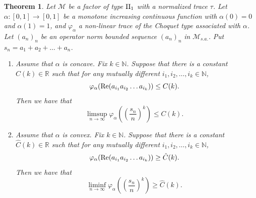 \documentclass[a4paper,12pt]{amsart}
\newtheorem{theorem}[definition]{Theorem}
\newcommand{\M}{\mathcal{M}}
\newcommand{\N}{\mathbb{N}}
\begin{document}
\begin{theorem} \label{psudo law of large numbers}
Let $\M$ be a factor of type ${\rm II}_1$ with a normalized trace $\tau$.  
Let $\alpha: [0,1]  \rightarrow [0, 1]$ be a monotone increasing continuous function with $\alpha(0) = 0$ 
and $\alpha(1) = 1$, and
$\varphi_{\alpha}$ a non-linear trace of the Choquet type associated with $\alpha$.  
Let $(a_n)_n$ be an operator norm bounded sequence $(a_n)_n$ in ${\M}_{s.a.}$. 
Put $s_n = a_1 + a_2 + \dots +a_n$.  
\begin{enumerate}
\item[(1)] Assume that  $\alpha$ is concave. Fix $k \in  \N$. Suppose that there is a constant 
$C(k) \in {\mathbb R}$ such that  
for any mutually different $i_1, i_2, \dots, i_k \in \N$, 
$$
\varphi_{\alpha}({\rm Re} (a_{i_1}a_{i_2} \dots a_{i_k}) ) \leq C(k).  
$$
Then we have that 
\[  \limsup _{n \to \infty}  \varphi_{\alpha}((\frac{s_n}{n})^k) \leq C(k) .\]
\item[(2)] Assume that  $\alpha$ is convex. Fix $k \in  \N$. Suppose that there is a constant 
$\hat{C}(k) \in {\mathbb R}$ such that  
for any mutually different $i_1, i_2, \dots, i_k \in \N$,   
$$
\varphi_{\alpha}({\rm Re} (a_{i_1}a_{i_2} \dots a_{i_k}) ) \geq \hat{C}(k). 
$$
Then we have that 
\[  \liminf _{n \to \infty}  \varphi_{\alpha}((\frac{s_n}{n})^k) \geq \hat{C}(k) .\]
\end{enumerate}
\end{theorem}
\end{document}

